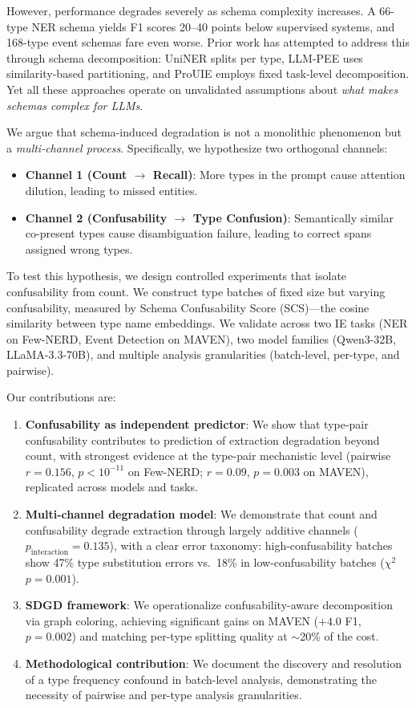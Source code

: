 \documentclass[11pt,a4paper]{article}
\begin{document}
However, performance degrades severely as schema complexity increases. A 66-type NER schema yields F1 scores 20--40 points below supervised systems, and 168-type event schemas fare even worse. Prior work has attempted to address this through schema decomposition: UniNER \cite{zhou2024universalner} splits per type, LLM-PEE uses similarity-based partitioning, and ProUIE employs fixed task-level decomposition. Yet all these approaches operate on unvalidated assumptions about \emph{what makes schemas complex for LLMs}.

We argue that schema-induced degradation is not a monolithic phenomenon but a \emph{multi-channel process}. Specifically, we hypothesize two orthogonal channels:
\begin{itemize}
    \item \textbf{Channel 1 (Count $\to$ Recall)}: More types in the prompt cause attention dilution, leading to missed entities.
    \item \textbf{Channel 2 (Confusability $\to$ Type Confusion)}: Semantically similar co-present types cause disambiguation failure, leading to correct spans assigned wrong types.
\end{itemize}

To test this hypothesis, we design controlled experiments that isolate confusability from count. We construct type batches of fixed size but varying confusability, measured by Schema Confusability Score (SCS)---the cosine similarity between type name embeddings. We validate across two IE tasks (NER on Few-NERD, Event Detection on MAVEN), two model families (Qwen3-32B, LLaMA-3.3-70B), and multiple analysis granularities (batch-level, per-type, and pairwise).

Our contributions are:
\begin{enumerate}
    \item \textbf{Confusability as independent predictor}: We show that type-pair confusability contributes to prediction of extraction degradation beyond count, with strongest evidence at the type-pair mechanistic level (pairwise $r=0.156$, $p<10^{-11}$ on Few-NERD; $r=0.09$, $p=0.003$ on MAVEN), replicated across models and tasks.
    \item \textbf{Multi-channel degradation model}: We demonstrate that count and confusability degrade extraction through largely additive channels ($p_{\text{interaction}}=0.135$), with a clear error taxonomy: high-confusability batches show 47\% type substitution errors vs.\ 18\% in low-confusability batches ($\chi^2$ $p=0.001$).
    \item \textbf{SDGD framework}: We operationalize confusability-aware decomposition via graph coloring, achieving significant gains on MAVEN ($+4.0$ F1, $p=0.002$) and matching per-type splitting quality at $\sim$20\% of the cost.
    \item \textbf{Methodological contribution}: We document the discovery and resolution of a type frequency confound in batch-level analysis, demonstrating the necessity of pairwise and per-type analysis granularities.
\end{enumerate}
\end{document}
